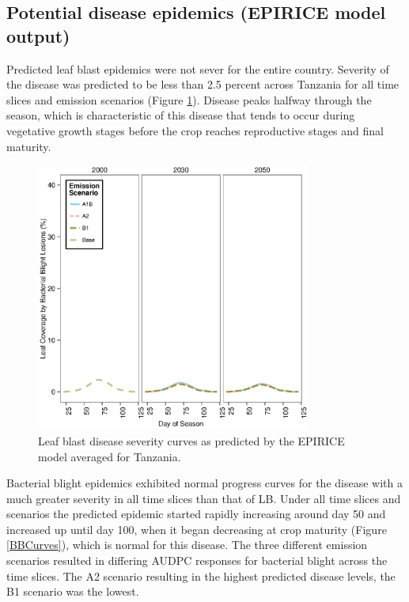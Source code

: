 \documentclass[preprint,review,12pt]{elsarticle}
\begin{document}
    \subsection{Potential disease epidemics (EPIRICE model output)}
    Predicted leaf blast epidemics were not sever for the entire country. Severity of the disease was predicted to be less than 2.5 percent across Tanzania for all time slices and emission scenarios (Figure \ref{LBCurves}). Disease peaks halfway through the season, which is characteristic of this disease that tends to occur during vegetative growth stages before the crop reaches reproductive stages and final maturity.
    
    \begin{figure}[H]
      \includegraphics[width = 90mm]{figures/LB}
      \caption{Leaf blast disease severity curves as predicted by the EPIRICE model averaged for Tanzania.}
        \label{LBCurves}
    \end{figure}
    
    Bacterial blight epidemics exhibited normal progress curves for the disease with a much greater severity in all time slices than that of LB. Under all time slices and scenarios the predicted epidemic started rapidly increasing around day 50 and increased up until day 100, when it began decreasing at crop maturity (Figure \ref{BBCurves}), which is normal for this disease. The three different emission scenarios resulted in differing AUDPC responses for bacterial blight across the time slices. The A2 scenario resulting in the highest predicted disease levels, the B1 scenario was the lowest.
    
\end{document}
